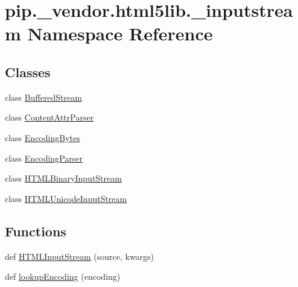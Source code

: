 \hypertarget{namespacepip_1_1__vendor_1_1html5lib_1_1__inputstream}{}\section{pip.\+\_\+vendor.\+html5lib.\+\_\+inputstream Namespace Reference}
\label{namespacepip_1_1__vendor_1_1html5lib_1_1__inputstream}
\subsection*{Classes}
\begin{DoxyCompactItemize}
\item 
class \hyperlink{classpip_1_1__vendor_1_1html5lib_1_1__inputstream_1_1BufferedStream}{Buffered\+Stream}
\item 
class \hyperlink{classpip_1_1__vendor_1_1html5lib_1_1__inputstream_1_1ContentAttrParser}{Content\+Attr\+Parser}
\item 
class \hyperlink{classpip_1_1__vendor_1_1html5lib_1_1__inputstream_1_1EncodingBytes}{Encoding\+Bytes}
\item 
class \hyperlink{classpip_1_1__vendor_1_1html5lib_1_1__inputstream_1_1EncodingParser}{Encoding\+Parser}
\item 
class \hyperlink{classpip_1_1__vendor_1_1html5lib_1_1__inputstream_1_1HTMLBinaryInputStream}{H\+T\+M\+L\+Binary\+Input\+Stream}
\item 
class \hyperlink{classpip_1_1__vendor_1_1html5lib_1_1__inputstream_1_1HTMLUnicodeInputStream}{H\+T\+M\+L\+Unicode\+Input\+Stream}
\end{DoxyCompactItemize}
\subsection*{Functions}
\begin{DoxyCompactItemize}
\item 
def \hyperlink{namespacepip_1_1__vendor_1_1html5lib_1_1__inputstream_a346ca791e1884dac06ef78e3b3c57194}{H\+T\+M\+L\+Input\+Stream} (source, kwargs)
\item 
def \hyperlink{namespacepip_1_1__vendor_1_1html5lib_1_1__inputstream_a11b8ac94763b999dc1e626bf5eea3601}{lookup\+Encoding} (encoding)
\end{DoxyCompactItemize}
